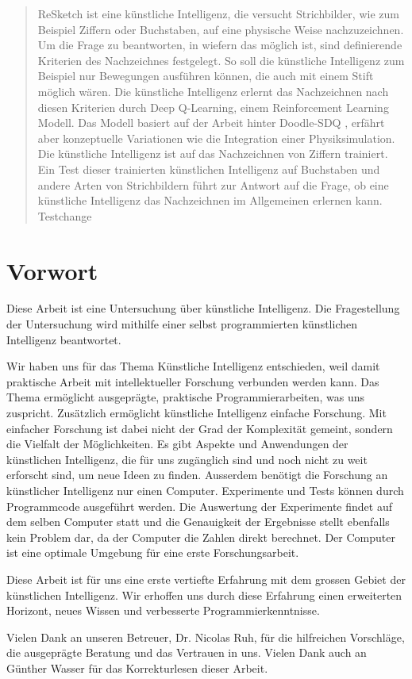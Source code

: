\begin{abstract}\label{abstract} ReSketch ist eine künstliche Intelligenz, die
versucht Strichbilder, wie zum Beispiel Ziffern oder Buchstaben, auf eine
physische Weise nachzuzeichnen. Um die Frage zu beantworten, in wiefern das
möglich ist, sind definierende Kriterien des Nachzeichnes festgelegt. So soll
die künstliche Intelligenz zum Beispiel nur Bewegungen ausführen können, die auch
mit einem Stift möglich wären. Die künstliche Intelligenz erlernt das
Nachzeichnen nach diesen Kriterien durch Deep Q-Learning, einem Reinforcement
Learning Modell. Das Modell basiert auf der Arbeit hinter Doodle-SDQ
\cite{zhou_learning_2018}, erfährt aber konzeptuelle Variationen wie die
Integration einer Physiksimulation. Die künstliche Intelligenz ist auf
das Nachzeichnen von Ziffern trainiert. Ein Test dieser trainierten künstlichen
Intelligenz auf Buchstaben und andere Arten von Strichbildern führt zur Antwort
auf die Frage, ob eine künstliche Intelligenz das Nachzeichnen im Allgemeinen
erlernen kann.    Testchange
\end{abstract}

\newpage

\section*{Vorwort}\label{vorwort}
Diese Arbeit ist eine Untersuchung über künstliche Intelligenz. Die
Fragestellung der Untersuchung wird mithilfe einer selbst programmierten künstlichen
Intelligenz beantwortet. 

Wir haben uns für das Thema Künstliche Intelligenz entschieden, weil damit
praktische Arbeit mit intellektueller Forschung verbunden werden kann. Das Thema
ermöglicht ausgeprägte, praktische Programmierarbeiten, was uns zuspricht.
Zusätzlich ermöglicht künstliche Intelligenz einfache Forschung. Mit einfacher
Forschung ist dabei nicht der Grad der Komplexität gemeint, sondern die Vielfalt
der Möglichkeiten. Es gibt Aspekte und Anwendungen der künstlichen Intelligenz,
die für uns zugänglich sind und noch nicht zu weit erforscht sind, um neue Ideen
zu finden. Ausserdem benötigt die Forschung an künstlicher Intelligenz nur einen
Computer. Experimente und Tests können durch Programmcode ausgeführt werden. Die
Auswertung der Experimente findet auf dem selben Computer statt und die
Genauigkeit der Ergebnisse stellt ebenfalls kein Problem dar, da der Computer
die Zahlen direkt berechnet. Der Computer ist eine optimale Umgebung für eine
erste Forschungsarbeit.

Diese Arbeit ist für uns eine erste vertiefte Erfahrung mit dem grossen Gebiet
der künstlichen Intelligenz. Wir erhoffen uns durch diese Erfahrung einen
erweiterten Horizont, neues Wissen und verbesserte Programmierkenntnisse.

Vielen Dank an unseren Betreuer, Dr. Nicolas Ruh, für die hilfreichen
Vorschläge, die ausgeprägte Beratung und das Vertrauen in uns. Vielen Dank auch
an Günther Wasser für das Korrekturlesen dieser Arbeit.
